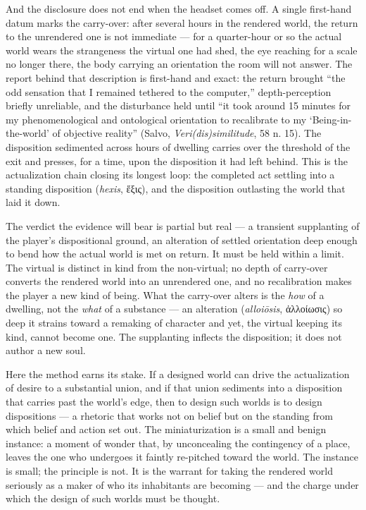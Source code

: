 \documentclass{article}
\newcommand{\gk}[1]{{\greekfont #1}}
\begin{document}
And the disclosure does not end when the headset comes off. A single first-hand datum marks the carry-over: after several hours in the rendered world, the return to the unrendered one is not immediate — for a quarter-hour or so the actual world wears the strangeness the virtual one had shed, the eye reaching for a scale no longer there, the body carrying an orientation the room will not answer. The report behind that description is first-hand and exact: the return brought ``the odd sensation that I remained tethered to the computer,'' depth-perception briefly unreliable, and the disturbance held until ``it took around 15 minutes for my phenomenological and ontological orientation to recalibrate to my `Being-in-the-world' of objective reality'' (Salvo, \textit{Veri(dis)similitude}, 58 n. 15). The disposition sedimented across hours of dwelling carries over the threshold of the exit and presses, for a time, upon the disposition it had left behind. This is the actualization chain closing its longest loop: the completed act settling into a standing disposition (\textit{hexis}, \gk{ἕξις}), and the disposition outlasting the world that laid it down.

The verdict the evidence will bear is partial but real — a transient supplanting of the player's dispositional ground, an alteration of settled orientation deep enough to bend how the actual world is met on return. It must be held within a limit. The virtual is distinct in kind from the non-virtual; no depth of carry-over converts the rendered world into an unrendered one, and no recalibration makes the player a new kind of being. What the carry-over alters is the \textit{how} of a dwelling, not the \textit{what} of a substance — an alteration (\textit{alloiōsis}, \gk{ἀλλοίωσις}) so deep it strains toward a remaking of character and yet, the virtual keeping its kind, cannot become one. The supplanting inflects the disposition; it does not author a new soul.

Here the method earns its stake. If a designed world can drive the actualization of desire to a substantial union, and if that union sediments into a disposition that carries past the world's edge, then to design such worlds is to design dispositions — a rhetoric that works not on belief but on the standing from which belief and action set out. The miniaturization is a small and benign instance: a moment of wonder that, by unconcealing the contingency of a place, leaves the one who undergoes it faintly re-pitched toward the world. The instance is small; the principle is not. It is the warrant for taking the rendered world seriously as a maker of who its inhabitants are becoming — and the charge under which the design of such worlds must be thought.
\end{document}
